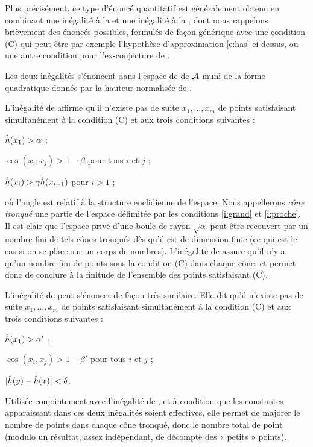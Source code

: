 \medskip

Plus précisément, ce type d'énoncé quantitatif est généralement obtenu en
combinant une inégalité à la  et une inégalité à la ,
dont nous rappelons brièvement des énoncés possibles, formulés de façon
générique avec une condition (C) qui peut être par exemple l'hypothèse
d'approximation \eqref{e:has} ci-dessus, ou une autre condition pour
l'ex-conjecture de .

Les deux inégalités s'énoncent dans l'espace de  de \( \mathcal A \)
muni de la forme quadratique donnée par la hauteur normalisée de
.

L'inégalité de  affirme qu'il n'existe pas de suite \( x_1, \dots,
  x_m \) de points satisfaisant simultanément à la condition (C) et aux trois
conditions suivantes :
\begin{enumthm}
  \item \( \hat h (x_1) > \alpha \) ; \label{i:grand}
  \item \( \cos(x_i, x_j) > 1 - \beta \) pour tous \( i \) et \( j \) ;
    \label{i:proche}
  \item \( \hat h (x_i) > \gamma \hat h (x_{i-1}) \) pour \( i > 1 \) ;
\end{enumthm}
où l'angle est relatif à la structure euclidienne de l'espace. Nous
appellerons \emph{cône tronqué} une partie de l'espace délimitée par les
conditions \vref{i:grand} et \vref{i:proche}. Il est clair que l'espace privé
d'une boule de rayon \( \sqrt{\alpha} \) peut être recouvert par un nombre
fini de tels cônes tronqués dès qu'il est de dimension finie (ce qui est le
cas si on se place sur un corps de nombres). L'inégalité de  assure
qu'il n'y a qu'un nombre fini de points sous la condition (C) dans chaque
cône, et permet donc de conclure à la finitude de l'ensemble des points
satisfaisant (C).

L'inégalité de  peut s'énoncer de façon très similaire. Elle dit
qu'il n'existe pas de suite \( x_1, \dots, x_m \) de points satisfaisant
simultanément à la condition (C) et aux trois conditions suivantes :
\begin{enumthm}
  \item $\hat h (x_1) > \alpha'$ ;
  \item $\cos(x_i, x_j) > 1 - \beta'$ pour tous $i$ et $j$ ;
  \item $\lvert \hat h (y) - \hat h (x) \rvert < \delta$.
\end{enumthm}
Utilisée conjointement avec l'inégalité de , et à condition que les
constantes apparaissant dans ces deux inégalités soient effectives, elle
permet de majorer le nombre de points dans chaque cône tronqué, donc le nombre
total de point (modulo un résultat, assez indépendant, de décompte des «
petits » points).

